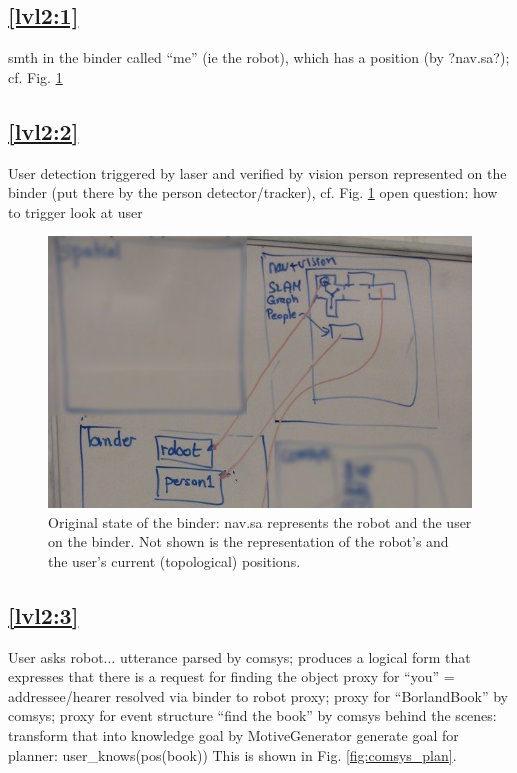 \documentclass{article}
\begin{document}
  
\subsection{\ref{lvl2:1}} smth in the binder called ``me'' (ie the robot),
	which has a position (by ?nav.sa?); cf. Fig. \ref{fig:nav_orig}
  
\subsection{\ref{lvl2:2}} User detection triggered by laser and 
	verified by vision
	person represented on the binder (put there by the person detector/tracker), cf. Fig. \ref{fig:nav_orig}
	open question: how to trigger look at user

\begin{figure}[bth]
\centering
	\includegraphics[width=\linewidth]{explorer_1.jpg}
	\caption{Original state of the binder: nav.sa represents the robot and the user on the binder.
	Not shown is the representation of the robot's and the user's current (topological) positions.} 
\label{fig:nav_orig}
\end{figure}


\subsection{\ref{lvl2:3}} User asks robot...
	utterance parsed by comsys; produces a logical form that expresses that there
	is a request for finding the object
	proxy for ``you'' = addressee/hearer resolved via binder to robot proxy;
	proxy for ``BorlandBook'' by comsys;
	proxy for event structure ``find the book'' by comsys
	behind the scenes: transform that into knowledge goal by MotiveGenerator
	generate goal for planner: user\_knows(pos(book))
	This is shown in Fig. \ref{fig:comsys_plan}.
	
\end{document}
